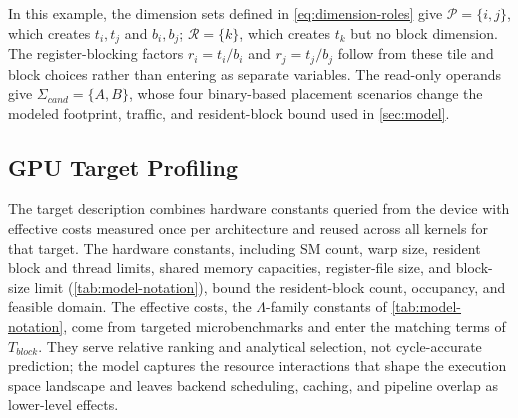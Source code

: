 \documentclass[acmsmall,review,anonymous,screen]{acmart}
\newcommand{\tile}{t}
\newcommand{\rblk}{r}
\begin{document}
In this example, the dimension sets defined in \autoref{eq:dimension-roles} give \(\mathcal{P}=\{i,j\}\), which creates \(\tile_i,\tile_j\) and \(b_i,b_j\); \(\mathcal{R}=\{k\}\), which creates \(\tile_k\) but no block dimension. The register-blocking factors \(\rblk_i=\tile_i/b_i\) and \(\rblk_j=\tile_j/b_j\) follow from these tile and block choices rather than entering as separate variables. The read-only operands give \(\Sigma_{\mathit{cand}}=\{A,B\}\), whose four binary-based placement scenarios change the modeled footprint, traffic, and resident-block bound used in \autoref{sec:model}.

\subsection{GPU Target Profiling}
\label{sec:gpu-target-profiling}

The target description combines hardware constants queried from the device with effective costs measured once per architecture and reused across all kernels for that target. The hardware constants, including SM count, warp size, resident block and thread limits, shared memory capacities, register-file size, and block-size limit (\autoref{tab:model-notation}), bound the resident-block count, occupancy, and feasible domain. The effective costs, the \(\Lambda\)-family constants of \autoref{tab:model-notation}, come from targeted microbenchmarks and enter the matching terms of \(T_{\mathit{block}}\). They serve relative ranking and analytical selection, not cycle-accurate prediction; the model captures the resource interactions that shape the execution space landscape and leaves backend scheduling, caching, and pipeline overlap as lower-level effects.
\end{document}

